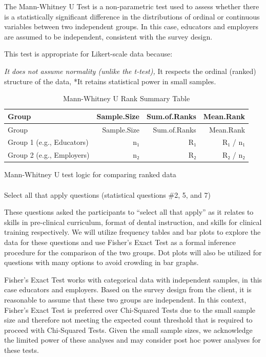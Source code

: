 \documentclass[
  11pt,
  letterpaper,
  DIV=11,
  numbers=noendperiod]{scrartcl}
\makeatletter
\let\oldparagraph\paragraph
\renewcommand{\paragraph}{
    \@ifstar
      \xxxParagraphStar
      \xxxParagraphNoStar
  }
\newcommand{\xxxParagraphStar}[1]{\oldparagraph*{#1}\mbox{}}
\newcommand{\xxxParagraphNoStar}[1]{\oldparagraph{#1}\mbox{}}
\numberwithin{figure}{section}
\makeatother
\begin{document}
The Mann-Whitney U Test is a non-parametric test used to assess whether
there is a statistically significant difference in the distributions of
ordinal or continuous variables between two independent groups. In this
case, educators and employers are assumed to be independent, consistent
with the survey design.

This test is appropriate for Likert-scale data because:

\emph{It does not assume normality (unlike the t-test), }It respects the
ordinal (ranked) structure of the data, *It retains statistical power in
small samples.

\begin{longtable}[]{@{}lrrr@{}}
\caption{Mann-Whitney U Rank Summary Table}\tabularnewline
\toprule\noalign{}
Group & Sample.Size & Sum.of.Ranks & Mean.Rank \\
\midrule\noalign{}
\endfirsthead
\toprule\noalign{}
Group & Sample.Size & Sum.of.Ranks & Mean.Rank \\
\midrule\noalign{}
\endhead
\bottomrule\noalign{}
\endlastfoot
Group 1 (e.g., Educators) & n₁ & R₁ & R₁ / n₁ \\
Group 2 (e.g., Employers) & n₂ & R₂ & R₂ / n₂ \\
\end{longtable}

Mann-Whitney U test logic for comparing ranked data

\paragraph{Select all that apply questions (statistical questions \#2,
5, and
7)}\label{select-all-that-apply-questions-statistical-questions-2-5-and-7}

These questions asked the participants to ``select all that apply'' as
it relates to skills in pre-clinical curriculum, format of dental
instruction, and skills for clinical training respectively. We will
utilize frequency tables and bar plots to explore the data for these
questions and use Fisher's Exact Test as a formal inference procedure
for the comparison of the two groups. Dot plots will also be utilized
for questions with many options to avoid crowding in bar graphs.

Fisher's Exact Test works with categorical data with independent
samples, in this case educators and employers. Based on the survey
design from the client, it is reasonable to assume that these two groups
are independent. In this context, Fisher's Exact Test is preferred over
Chi-Squared Tests due to the small sample size and therefore not meeting
the expected count threshold that is required to proceed with
Chi-Squared Tests. Given the small sample sizes, we acknowledge the
limited power of these analyses and may consider post hoc power analyses
for these tests.
\end{document}

